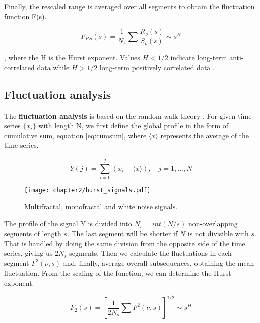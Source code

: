 Finally, the rescaled range is averaged over all segments to obtain the fluctuation function F(s).

$$F_{RS}(s) = \frac{1}{N_s}\sum \frac{R_{\nu}(s)}{S_{\nu}(s)} \sim s^H$$

, where the H is the Hurst exponent. Values $H<1/2$ indicate long-term anti-correlated data while $H>1/2$ long-term positively correlated data \cite{kantelhardt2008fractal}. 

\subsection{Fluctuation analysis}

The \textbf{fluctuation analysis} is based on the random walk theory \cite{kantelhardt2008fractal}. For given time series $\{x_i\}$ with length N, we first define the global profile in the form of cumulative sum, equation \ref{eq:cumsum}, where $\langle x\rangle $ represents the average of the time series. 

\begin{equation}
Y(j) = \sum_{i=0} ^j (x_i - \langle x\rangle), \quad j=1, ..., N
\label{eq:cumsum}
\end{equation}


\begin{figure}[h]
	\centering
	\texttt{[image: chapter2/hurst\_signals.pdf]}
	\caption{Multifractal, monofractal and white noise signals.}
	\label{fig:hurst_signals}
\end{figure}

The profile of the signal Y is divided into $N_s = int (N/s)$ non-overlapping segments of length $s$. The last segment will be shorter if $N$ is not divisible with $s$. That is handled by doing the same division from the opposite side of the time series, giving us $2N_s$ segments. Then we calculate the fluctuations in each segment $F^2(\nu, s)$ and, finally, average overall subsequences, obtaining the mean fluctuation. From the scaling of the function, we can determine the Hurst exponent. 

\begin{equation}
F_2(s) = [\frac{1}{2N_s} \sum F^2(\nu,s)]^{1/2}  \sim s^H
\end{equation} 

